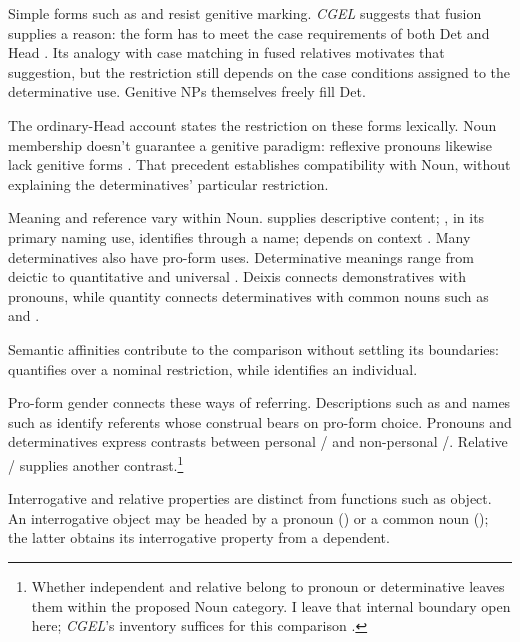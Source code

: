 \documentclass[12pt]{article}
\begin{document}
Simple forms such as  and  resist genitive marking. \textit{CGEL} suggests that fusion supplies a reason: the form has to meet the case requirements of both Det and Head \citep[420]{huddleston2002}. Its analogy with case matching in fused relatives \citep[1073--1074]{huddleston2002} motivates that suggestion, but the restriction still depends on the case conditions assigned to the determinative use. Genitive NPs themselves freely fill Det.

The ordinary-Head account states the restriction on these forms lexically. Noun membership doesn't guarantee a genitive paradigm: reflexive pronouns likewise lack genitive forms \citep[426]{huddleston2002}. That precedent establishes compatibility with Noun, without explaining the determinatives' particular restriction.

Meaning and reference vary within Noun.  supplies descriptive content; , in its primary naming use, identifies through a name;  depends on context \citep[425--428, 516--521]{huddleston2002}. Many determinatives also have pro-form uses. Determinative meanings range from deictic  to quantitative  and universal  \citep[358--360, 370--405]{huddleston2002}. Deixis connects demonstratives with pronouns, while quantity connects determinatives with common nouns such as  and .

Semantic affinities contribute to the comparison without settling its boundaries:  quantifies over a nominal restriction, while  identifies an individual.

Pro-form gender \citep{reynolds2025proformgender} connects these ways of referring. Descriptions such as  and names such as  identify referents whose construal bears on pro-form choice. Pronouns and determinatives express contrasts between personal / and non-personal /. Relative / supplies another contrast.\footnote{Whether independent  and relative  belong to pronoun or determinative leaves them within the proposed Noun category. I leave that internal boundary open here; \textit{CGEL}'s inventory suffices for this comparison \citep[397--399]{huddleston2002}.}

Interrogative and relative properties are distinct from functions such as object. An interrogative object may be headed by a pronoun () or a common noun (); the latter obtains its interrogative property from a dependent.
\end{document}
